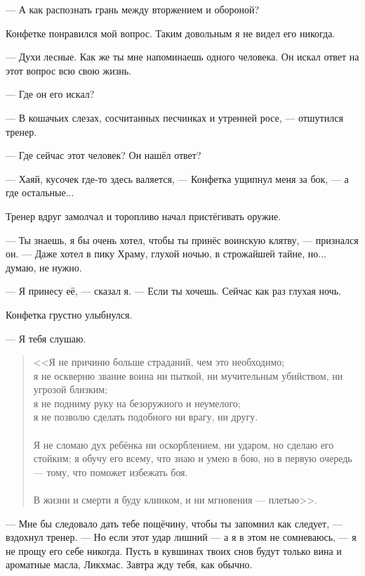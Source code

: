 --- А как распознать грань между вторжением и обороной?

Конфетке понравился мой вопрос.
Таким довольным я не видел его никогда.

--- Духи лесные.
Как же ты мне напоминаешь одного человека.
Он искал ответ на этот вопрос всю свою жизнь.

--- Где он его искал?

--- В кошачьих слезах, сосчитанных песчинках и утренней росе\FM, --- отшутился тренер.

--- Где сейчас этот человек?
Он нашёл ответ?

--- Хаяй, кусочек где-то здесь валяется, --- Конфетка ущипнул меня за бок, --- а где остальные...

Тренер вдруг замолчал и торопливо начал пристёгивать оружие.

--- Ты знаешь, я бы очень хотел, чтобы ты принёс воинскую клятву, --- признался он.
--- Даже хотел в пику Храму, глухой ночью, в строжайшей тайне, но... думаю, не нужно.

--- Я принесу её, --- сказал я.
--- Если ты хочешь.
Сейчас как раз глухая ночь.

Конфетка грустно улыбнулся.

--- Я тебя слушаю.

\begin{quote}
<<Я не причиню больше страданий, чем это необходимо;\\
я не оскверню звание воина ни пыткой, ни мучительным убийством, ни угрозой близким;\\
я не подниму руку на безоружного и неумелого;\\
я не позволю сделать подобного ни врагу, ни другу.\\~\\
Я не сломаю дух ребёнка ни оскорблением, ни ударом, но сделаю его стойким;
я обучу его всему, что знаю и умею в бою, но в первую очередь --- тому, что поможет избежать боя.\\~\\
В жизни и смерти я буду клинком, и ни мгновения --- плетью>>.
\end{quote}

--- Мне бы следовало дать тебе пощёчину, чтобы ты запомнил как следует, --- вздохнул тренер.
--- Но если этот удар лишний --- а я в этом не сомневаюсь, --- я не прощу его себе никогда.
Пусть в кувшинах твоих снов будут только вина и ароматные масла, Ликхмас.
Завтра жду тебя, как обычно.

